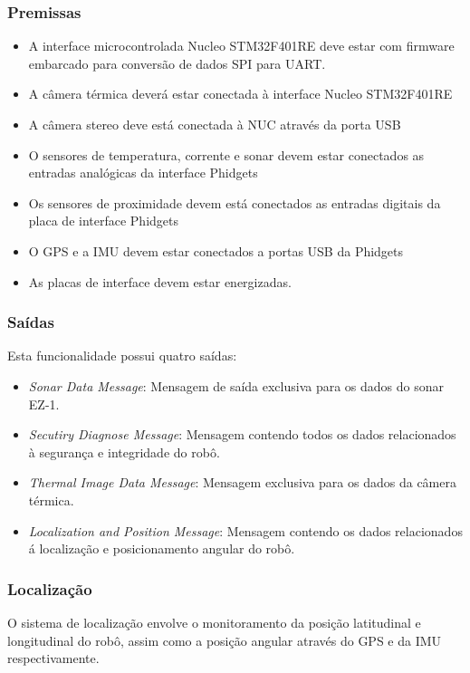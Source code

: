 \subsubsection{Premissas}
\begin{itemize}
	\item A interface microcontrolada Nucleo STM32F401RE deve estar com firmware embarcado para conversão de dados SPI para UART.
	\item A câmera térmica deverá estar conectada à interface Nucleo STM32F401RE
	\item A câmera stereo deve está conectada à NUC através da porta USB
	\item O sensores de temperatura, corrente e sonar devem estar conectados as entradas analógicas da interface Phidgets
	\item Os sensores de proximidade devem está conectados as entradas digitais da placa de interface Phidgets
	\item O GPS e a IMU devem estar conectados a portas USB da Phidgets
	\item As placas de interface devem estar energizadas.
\end{itemize}

\subsubsection{Saídas}

Esta funcionalidade possui quatro saídas:

\begin{itemize}
	\item \textit{Sonar Data Message}: Mensagem de saída exclusiva para os dados do sonar EZ-1.
	\item \textit{Secutiry Diagnose Message}: Mensagem contendo todos os dados relacionados à segurança e integridade do robô.
	\item \textit{Thermal Image Data Message}: Mensagem exclusiva para os dados da câmera térmica.
	\item \textit{Localization and Position Message}: Mensagem contendo os dados relacionados á localização e posicionamento angular do robô.
\end{itemize}

\subsubsection{Localização}
\label{ssec:func2}

O sistema de localização envolve o monitoramento da posição latitudinal e longitudinal do robô, assim como a posição angular através do GPS e da IMU respectivamente.

